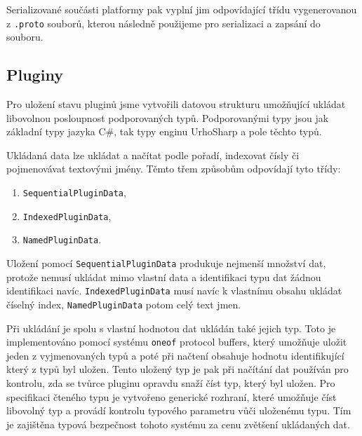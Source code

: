 Serializované součásti platformy pak vyplní jim odpovídající třídu vygenerovanou z \texttt{.proto} souborů, kterou následně použijeme pro serializaci a zapsání do souboru.

\subsection{Pluginy}
Pro uložení stavu pluginů jsme vytvořili datovou strukturu umožňující ukládat libovolnou posloupnost podporovaných typů. Podporovanými typy jsou jak základní typy jazyka C\#, tak typy enginu UrhoSharp a pole těchto typů.

Ukládaná data lze ukládat a načítat podle pořadí, indexovat čísly či pojmenovávat textovými jmény. Těmto třem způsobům odpovídají tyto třídy:
\begin{enumerate}
	\item \texttt{SequentialPluginData},
	\item \texttt{IndexedPluginData},
	\item \texttt{NamedPluginData}.
\end{enumerate}

Uložení pomocí \texttt{SequentialPluginData} produkuje nejmenší množství dat, protože nemusí ukládat mimo vlastní data a identifikaci typu dat žádnou identifikaci navíc. \texttt{IndexedPluginData} musí navíc k vlastnímu obsahu ukládat číselný index, \texttt{NamedPluginData} potom celý text jmen.

Při ukládání je spolu s vlastní hodnotou dat ukládán také jejich typ. Toto je implementováno pomocí systému \texttt{oneof} protocol buffers, který umožňuje uložit jeden z vyjmenovaných typů a poté při načtení obsahuje hodnotu identifikující který z typů byl uložen. Tento uložený typ je pak při načítání dat používán pro kontrolu, zda se tvůrce pluginu opravdu snaží číst typ, který byl uložen. Pro specifikaci čteného typu je vytvořeno generické rozhraní, které umožňuje číst libovolný typ a provádí kontrolu typového parametru vůči uloženému typu. Tím je zajištěna typová bezpečnost tohoto systému za cenu zvětšení ukládaných dat.


